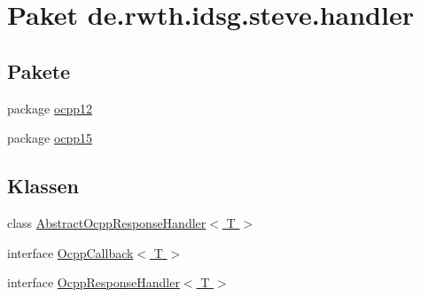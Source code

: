 \hypertarget{namespacede_1_1rwth_1_1idsg_1_1steve_1_1handler}{\section{Paket de.\-rwth.\-idsg.\-steve.\-handler}
\label{namespacede_1_1rwth_1_1idsg_1_1steve_1_1handler}
}
\subsection*{Pakete}
\begin{DoxyCompactItemize}
\item 
package \hyperlink{namespacede_1_1rwth_1_1idsg_1_1steve_1_1handler_1_1ocpp12}{ocpp12}
\item 
package \hyperlink{namespacede_1_1rwth_1_1idsg_1_1steve_1_1handler_1_1ocpp15}{ocpp15}
\end{DoxyCompactItemize}
\subsection*{Klassen}
\begin{DoxyCompactItemize}
\item 
class \hyperlink{classde_1_1rwth_1_1idsg_1_1steve_1_1handler_1_1_abstract_ocpp_response_handler_3_01_t_01_4}{Abstract\-Ocpp\-Response\-Handler$<$ T $>$}
\item 
interface \hyperlink{interfacede_1_1rwth_1_1idsg_1_1steve_1_1handler_1_1_ocpp_callback_3_01_t_01_4}{Ocpp\-Callback$<$ T $>$}
\item 
interface \hyperlink{interfacede_1_1rwth_1_1idsg_1_1steve_1_1handler_1_1_ocpp_response_handler_3_01_t_01_4}{Ocpp\-Response\-Handler$<$ T $>$}
\end{DoxyCompactItemize}
